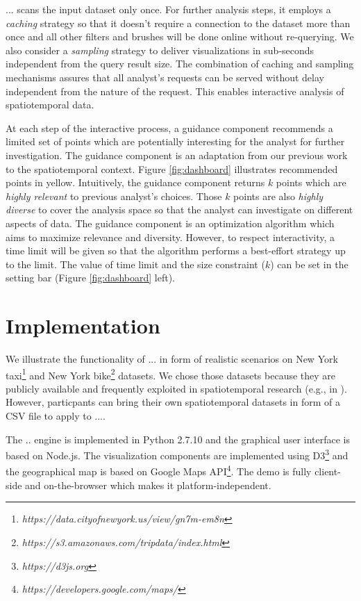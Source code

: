 \documentclass[runningheads,a4paper]{llncs}
\begin{document}
... scans the input dataset only once. For further analysis steps, it employs a {\em caching} strategy so that it doesn't require a connection to the dataset more than once and all other filters and brushes will be done online without re-querying. We also consider a {\em sampling} strategy to deliver visualizations in sub-seconds independent from the query result size. The combination of caching and sampling mechanisms assures that all analyst's requests can be served without delay independent from the nature of the request. This enables interactive analysis of spatiotemporal data.

At each step of the interactive process, a guidance component recommends a limited set of points which are potentially interesting for the analyst for further investigation. The guidance component is an adaptation from our previous work~\cite{Omidvar-Tehrani:2015} to the spatiotemporal context. Figure \ref{fig:dashboard} illustrates recommended points in yellow. Intuitively, the guidance component returns $k$ points which are {\em highly relevant} to previous analyst's choices. Those $k$ points are also {\em highly diverse} to cover the analysis space so that the analyst can investigate on different aspects of data. The guidance component is an optimization algorithm which aims to maximize relevance and diversity. However, to respect interactivity, a time limit will be given so that the algorithm performs a best-effort strategy up to the limit. The value of time limit and the size constraint ($k$) can be set in the setting bar (Figure \ref{fig:dashboard} left).

\vspace{-5pt}
\section{Implementation}

 We illustrate the functionality of ... in form of realistic scenarios on New York taxi\footnote{\it https://data.cityofnewyork.us/view/gn7m-em8n} and New York bike\footnote{\it https://s3.amazonaws.com/tripdata/index.html} datasets. We chose those datasets because they are publicly available and frequently exploited in spatiotemporal research (e.g., in \cite{DBLP:journals/debu/FreireCVZ16}). However, particpants can bring their own spatiotemporal datasets in form of a CSV file to apply to ....

 The .. engine is implemented in Python 2.7.10 and the graphical user interface is based on Node.js. The visualization components are implemented using {\sc D3}\footnote{\it https://d3js.org} and the geographical map is based on {\sc Google Maps API}\footnote{\it https://developers.google.com/maps/}. The demo is fully client-side and on-the-browser which makes it platform-independent. 
\end{document}
